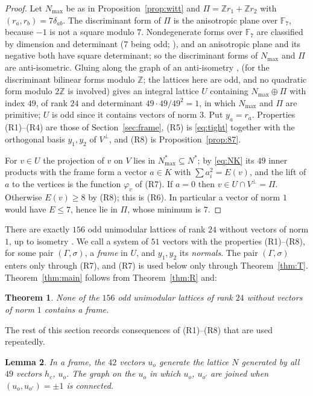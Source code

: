 \documentclass[11pt]{amsart}
\newtheorem{theorem}{Theorem}[section]
\newtheorem{lemma}[theorem]{Lemma}
\theoremstyle{definition}
\theoremstyle{remark}
\newcommand{\Z}{\mathbb{Z}}
\newcommand{\F}{\mathbb{F}}
\newcommand{\G}{\Gamma}
\newcommand{\s}{\sigma}
\newcommand{\Pl}{\Pi}
\begin{document}
\begin{proof}
Let $N_{\max}$ be as in Proposition~\ref{prop:witt} and $\Pl=\Z r_1+\Z r_2$ with $(r_a,r_b)=7\delta_{ab}$. The discriminant
form of $\Pl$ is the anisotropic plane over $\F_7$, because $-1$ is not a square modulo $7$. Nondegenerate forms over $\F_7$
are classified by dimension and determinant ($7$ being odd; \cite[Ch.~IV, \S1.7]{Serre}), and an anisotropic plane and its negative both have square determinant; so the
discriminant forms of $N_{\max}$ and $\Pl$ are anti-isometric. Gluing along the graph of an anti-isometry \cite[\S1]{Nik}, \cite[Ch.~4, \S3]{SPLAG} (for the discriminant bilinear forms modulo $\Z$; the lattices here are odd, and no quadratic form modulo $2\Z$ is
involved) gives an integral lattice $U$ containing $N_{\max}\oplus\Pl$ with index $49$, of rank $24$ and determinant $49\cdot49/49^2=1$, in which
$N_{\max}$ and $\Pl$ are primitive; $U$ is odd since it contains vectors of norm $3$. Put $y_a=r_a$. Properties (R1)--(R4)
are those of Section~\ref{sec:frame}, (R5) is \eqref{eq:tight} together with the orthogonal basis $y_1,y_2$ of $V^\perp$, and
(R8) is Proposition~\ref{prop:87}.

For $v\in U$ the projection of $v$ on $V$ lies in $N_{\max}^*\subseteq N^*$; by \eqref{eq:NK} its $49$ inner products with the
frame form a vector $a\in K$ with $\sum a_i^2=E(v)$, and the lift of $a$ to the vertices is the function $\varphi_v$ of (R7).
If $a=0$ then $v\in U\cap V^\perp=\Pl$. Otherwise $E(v)\ge8$ by (R8); this is (R6). In particular a vector of norm $1$ would
have $E\le7$, hence lie in $\Pl$, whose minimum is $7$.
\end{proof}

There are exactly $156$ odd unimodular lattices of rank $24$ without vectors of norm $1$, up to isometry
\cite{Bor}. We call a system of $51$ vectors with the properties (R1)--(R8), for some pair $(\G,\s)$, a \emph{frame} in $U$,
and $y_1,y_2$ its \emph{normals}. The pair $(\G,\s)$ enters only through (R7), and (R7) is used below only through
Theorem~\ref{thm:T}. Theorem~\ref{thm:main} follows from Theorem~\ref{thm:R} and:

\begin{theorem}\label{thm:B}
None of the $156$ odd unimodular lattices of rank $24$ without vectors of norm $1$ contains a frame.
\end{theorem}

The rest of this section records consequences of (R1)--(R8) that are used repeatedly.

\begin{lemma}\label{lem:gen}
In a frame, the $42$ vectors $u_o$ generate the lattice $N$ generated by all $49$ vectors $h_c$, $u_o$. The graph on the $u_o$
in which $u_o$, $u_{o'}$ are joined when $(u_o,u_{o'})=\pm1$ is connected.
\end{lemma}
\end{document}
